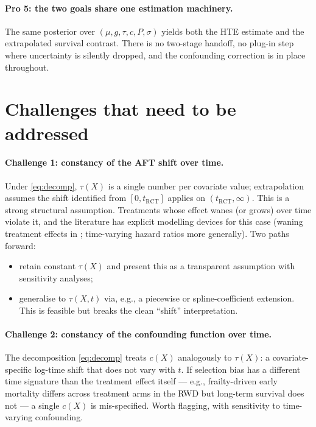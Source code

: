 \documentclass[11pt]{article}
\theoremstyle{plain}
\theoremstyle{definition}
\theoremstyle{remark}
\newcommand{\1}{\mathds{1}}
\newcommand{\X}{X}
\newcommand{\tauf}{\tau}
\newcommand{\cf}{c}
\newcommand{\gf}{g}
\newcommand{\muf}{\mu}
\newcommand{\RCT}{\mathrm{RCT}}
\begin{document}
\paragraph{Pro 5: the two goals share one estimation machinery.} The same
posterior over $(\muf, \gf, \tauf, \cf, P, \sigma)$ yields both
the HTE estimate and the extrapolated survival contrast. There is no
two-stage handoff, no plug-in step where uncertainty is silently dropped,
and the confounding correction is in place throughout.

\section{Challenges that need to be addressed}

\paragraph{Challenge 1: constancy of the AFT shift over time.}
Under \eqref{eq:decomp}, $\tauf(\X)$ is a single number per covariate value;
extrapolation assumes the shift identified from $[0, t_{\RCT}]$ applies on
$(t_{\RCT}, \infty)$. This is a strong structural assumption. Treatments
whose effect wanes (or grows) over time violate it, and the literature has
explicit modelling devices for this case (waning treatment effects in
\citet{Jackson2023}; time-varying hazard ratios more generally). Two paths
forward:
\begin{itemize}[leftmargin=*]
  \item[(a)] retain constant $\tauf(\X)$ and present this as a transparent
        assumption with sensitivity analyses;
  \item[(b)] generalise to $\tauf(\X, t)$ via, e.g., a piecewise or
        spline-coefficient extension. This is feasible but breaks the
        clean ``shift'' interpretation.
\end{itemize}

\paragraph{Challenge 2: constancy of the confounding function over time.}
The decomposition \eqref{eq:decomp} treats $\cf(\X)$ analogously to
$\tauf(\X)$: a covariate-specific log-time shift that does not vary with $t$.
If selection bias has a different time signature than the treatment effect
itself --- e.g., frailty-driven early mortality differs across treatment
arms in the RWD but long-term survival does not --- a single $\cf(\X)$ is
mis-specified. Worth flagging, with sensitivity to time-varying confounding.
\end{document}
